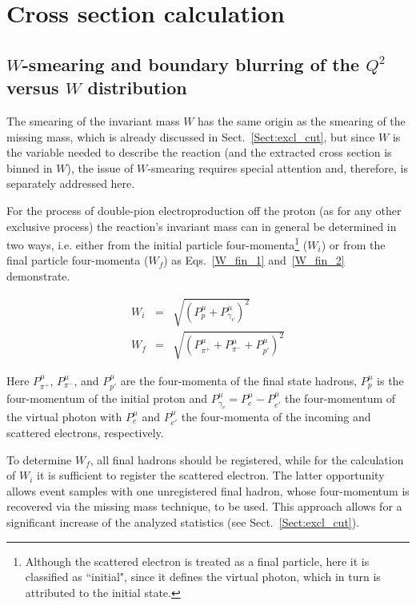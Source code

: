 \setcounter{chapter}{2}
\chapter{Cross section calculation}
\label{Sect:cr_sect}



\section{$W$-smearing and boundary blurring of the $Q^{2}$ versus $W$ distribution}
\label{Sect:smearing_blurring}

The smearing of the invariant mass $W$ has the same origin as the smearing of the missing mass, which is already discussed in Sect.~\ref{Sect:excl_cut}, but since $W$ is the variable needed to describe the reaction (and the extracted cross section is binned in $W$), the issue of $W$-smearing requires special attention and, therefore, is separately addressed here.


For the process of double-pion electroproduction off the proton (as for any other exclusive process) the reaction's invariant mass can in general be determined in two ways, i.e. either from the initial particle  four-momenta\footnote[1]{Although the scattered electron is treated as a final particle, here it is classified as ``initial", since it defines the virtual photon, which in turn is attributed to the initial state.} ($W_{i}$) or from the final particle  four-momenta ($W_{f}$) as Eqs.~\eqref{W_fin_1} and~\eqref{W_fin_2} demonstrate. 


\begin{eqnarray}
W_{i}&= & \sqrt{(P_{p}^{\mu}+P_{\gamma_{v}}^{\mu})^{2}} \label{W_fin_1} \\
W_{f}&= & \sqrt{(P_{\pi^{+}}^{\mu}+P_{\pi^{-}}^{\mu}+P_{p'}^{\mu})^{2}} \label{W_fin_2}
\end{eqnarray}

Here $P_{\pi^{+}}^{\mu}$, $P_{\pi^{-}}^{\mu}$, and $P_{p'}^{\mu}$ are the four-momenta of the final state hadrons, $P_{p}^{\mu}$ is the four-momentum of the initial proton and $P_{\gamma_{v}}^{\mu}=P_{e}^{\mu}-P_{e'}^{\mu}$ the four-momentum of the virtual photon with $P_{e}^{\mu}$ and $P_{e'}^{\mu}$ the four-momenta of the incoming and scattered electrons, respectively. 

To determine $W_{f}$, all final hadrons should be registered, while for the calculation of $W_{i}$ it is sufficient to register the scattered electron. The latter opportunity allows event samples with one unregistered final hadron, whose four-momentum is recovered via the missing mass technique, to be used. This approach allows for a significant increase of the analyzed statistics (see Sect.~\ref{Sect:excl_cut}).

